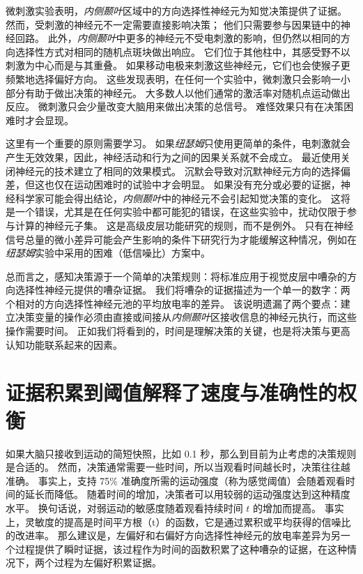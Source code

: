 微刺激实验表明，\textit{内侧颞叶}区域中的方向选择性神经元为知觉决策提供了证据。
然而，受刺激的神经元不一定需要直接影响决策；
他们只需要参与因果链中的神经回路。
此外，\textit{内侧颞叶}中更多的神经元不受电刺激的影响，但仍然以相同的方向选择性方式对相同的随机点斑块做出响应。
它们位于其他柱中，其感受野不以刺激为中心而是与其重叠。
如果移动电极来刺激这些神经元，它们也会使猴子更频繁地选择偏好方向。
这些发现表明，在任何一个实验中，微刺激只会影响一小部分有助于做出决策的神经元。
大多数人以他们通常的激活率对随机点运动做出反应。
微刺激只会少量改变大脑用来做出决策的总信号。
难怪效果只有在决策困难时才会显现。


这里有一个重要的原则需要学习。
如果\textit{纽瑟姆}只使用更简单的条件，电刺激就会产生无效效果，因此，神经活动和行为之间的因果关系就不会成立。
最近使用关闭神经元的技术建立了相同的效果模式。
沉默会导致对沉默神经元方向的选择偏差，但这也仅在运动困难时的试验中才会明显。
如果没有充分或必要的证据，神经科学家可能会得出结论，\textit{内侧颞叶}中的神经元不会引起知觉决策的变化。
这将是一个错误，尤其是在任何实验中都可能犯的错误，在这些实验中，扰动仅限于参与计算的神经元子集。
这是高级皮层功能研究的规则，而不是例外。
只有在神经信号总量的微小差异可能会产生影响的条件下研究行为才能缓解这种情况，例如在\textit{纽瑟姆}实验中采用的困难（低信噪比）方案中。


总而言之，感知决策源于一个简单的决策规则：将标准应用于视觉皮层中嘈杂的方向选择性神经元提供的嘈杂证据。
我们将嘈杂的证据描述为一个单一的数字：两个相对的方向选择性神经元池的平均放电率的差异。
该说明遗漏了两个要点：建立决策变量的操作必须由直接或间接从\textit{内侧颞叶}区接收信息的神经元执行，而这些操作需要时间。
正如我们将看到的，时间是理解决策的关键，也是将决策与更高认知功能联系起来的因素。



\section{证据积累到阈值解释了速度与准确性的权衡}

如果大脑只接收到运动的简短快照，比如 0.1 秒，那么到目前为止考虑的决策规则是合适的。
然而，决策通常需要一些时间，所以当观看时间越长时，决策往往越准确。
事实上，支持 75\% 准确度所需的运动强度（称为感觉阈值）会随着观看时间的延长而降低。
随着时间的增加，决策者可以用较弱的运动强度达到这种精度水平。
换句话说，对弱运动的敏感度随着观看持续时间 $ t $ 的增加而提高。
事实上，灵敏度的提高是时间平方根（t）的函数，它是通过累积或平均获得的信噪比的改进率。
那么建议是，左偏好和右偏好方向选择性神经元的放电率差异为另一个过程提供了瞬时证据，该过程作为时间的函数积累了这种嘈杂的证据，在这种情况下，两个过程为左偏好积累证据。


